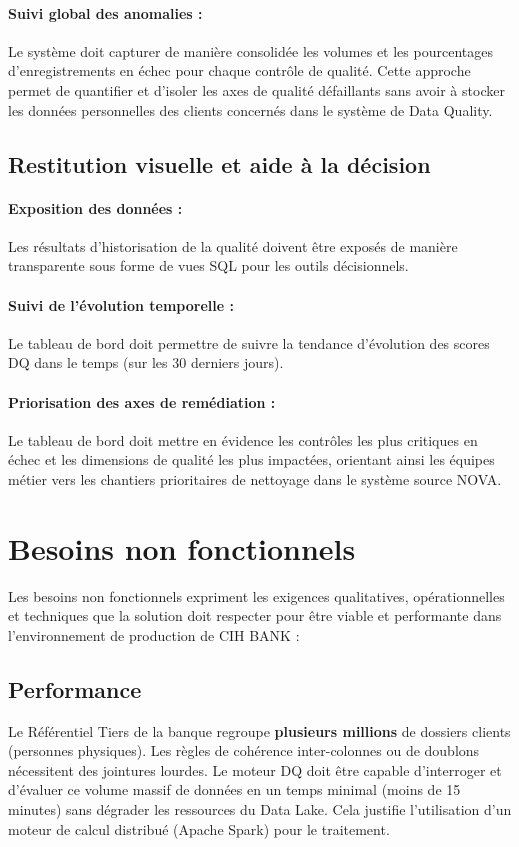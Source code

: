 \paragraph{Suivi global des anomalies :} Le système doit capturer de manière consolidée les volumes et les pourcentages d'enregistrements en échec pour chaque contrôle de qualité. Cette approche permet de quantifier et d'isoler les axes de qualité défaillants sans avoir à stocker les données personnelles des clients concernés dans le système de Data Quality.

\subsection{Restitution visuelle et aide à la décision}
\paragraph{Exposition des données :} Les résultats d'historisation de la qualité doivent être exposés de manière transparente sous forme de vues SQL pour les outils décisionnels.

\paragraph{Suivi de l'évolution temporelle :} Le tableau de bord doit permettre de suivre la tendance d'évolution des scores DQ dans le temps (sur les 30 derniers jours).

\paragraph{Priorisation des axes de remédiation :} Le tableau de bord doit mettre en évidence les contrôles les plus critiques en échec et les dimensions de qualité les plus impactées, orientant ainsi les équipes métier vers les chantiers prioritaires de nettoyage dans le système source NOVA.

\section{Besoins non fonctionnels}

Les besoins non fonctionnels expriment les exigences qualitatives, opérationnelles et techniques que la solution doit respecter pour être viable et performante dans l'environnement de production de CIH BANK :

\subsection{Performance}
Le Référentiel Tiers de la banque regroupe \textbf{plusieurs millions} de dossiers clients (personnes physiques). Les règles de cohérence inter-colonnes ou de doublons nécessitent des jointures lourdes. Le moteur DQ doit être capable d'interroger et d'évaluer ce volume massif de données en un temps minimal (moins de 15 minutes) sans dégrader les ressources du Data Lake. Cela justifie l'utilisation d'un moteur de calcul distribué (Apache Spark) pour le traitement.


